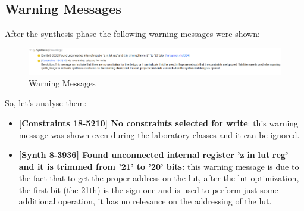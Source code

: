 \subsection{Warning Messages}
After the synthesis phase the following warning messages were shown:
\begin{figure}[H]
	\centering
	\includegraphics[width=\textwidth]{img/vivado/warnings.png}
	\caption{Warning Messages}
\end{figure}
So, let's analyse them:
\begin{itemize}
	\item \textbf{[Constraints 18-5210] No constraints selected for write}: this warning message was shown even during the laboratory classes and it can be ignored. 
	\item \textbf{[Synth 8-3936] Found unconnected internal register 'z$\_$in$\_$lut$\_$reg' and it is trimmed from '21' to '20' bits:} this warning message is due to the fact that to get the proper address on the lut, after the lut optimization, the first bit (the 21th) is the sign one and is used to perform just some additional operation, it has no relevance on the addressing of the lut.
\end{itemize}